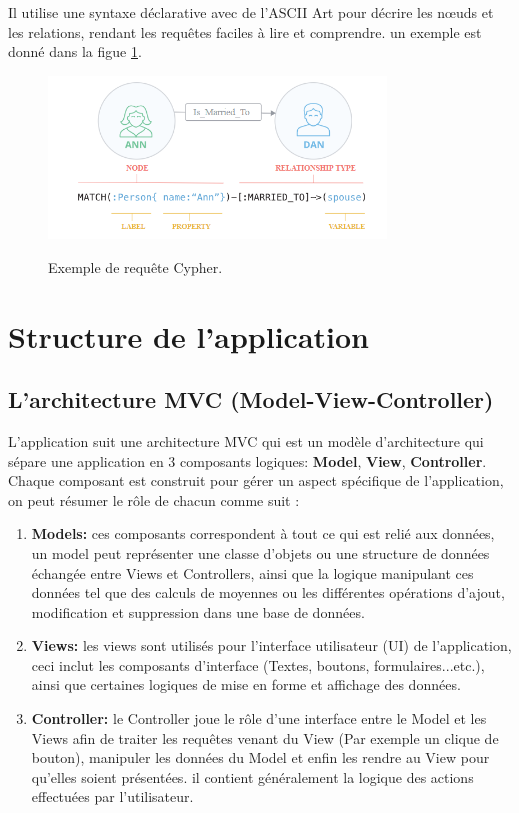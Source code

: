 Il utilise une syntaxe déclarative avec de l'ASCII Art pour décrire les nœuds et les relations, rendant les requêtes faciles à lire et comprendre. un exemple est donné dans la figue \ref{fig:cypher}.

\begin{figure}
	\center
	\includegraphics[width=0.8\textwidth]{img/cypher.png}
	\label{fig:cypher}
	\caption{Exemple de requête Cypher.}
\end{figure}
		
\section{Structure de l'application}
\subsection{L'architecture MVC (Model-View-Controller)}
L'application suit une architecture MVC qui est un modèle d'architecture qui sépare une application en 3 composants logiques: \textbf{Model}, \textbf{View}, \textbf{Controller}.
Chaque composant est construit pour gérer un aspect spécifique de l'application, on peut résumer le rôle de chacun comme suit :
\begin{enumerate}
	\item \textbf{Models: } ces composants correspondent à tout ce qui est relié aux données, un model peut représenter une classe d'objets ou une structure de données échangée entre Views et Controllers, ainsi que la logique manipulant ces données tel que des calculs de moyennes ou les différentes opérations d'ajout, modification et suppression dans une base de données.
	\item \textbf{Views:} les views sont utilisés pour l'interface utilisateur (UI) de l'application, ceci inclut les composants d'interface (Textes, boutons, formulaires...etc.), ainsi que certaines logiques de mise en forme et affichage des données.
	\item \textbf{Controller: } le Controller joue le rôle d'une interface entre le Model et les Views afin de traiter les requêtes venant du View (Par exemple un clique de bouton), manipuler les données du Model et enfin les rendre au View pour qu'elles soient présentées. il contient généralement la logique des actions effectuées par l'utilisateur.
\end{enumerate}
	
